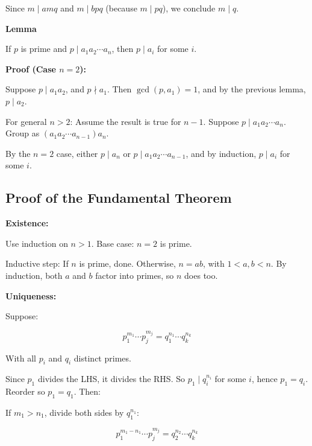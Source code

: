 Since \(m \mid amq\) and \(m \mid bpq\) (because \(m \mid pq\)), we conclude \(m \mid q\).

\QED

\textbf{Lemma} 

If \(p\) is prime and \(p \mid a_1a_2 \cdots a_n\), then \(p \mid a_i\) for some \(i\).
\vspace{\baselineskip}

\textbf{Proof (Case \(n=2\)):} 

Suppose \(p \mid a_1a_2\), and \(p \nmid a_1\).
Then \(\gcd(p, a_1) = 1\), and by the previous lemma, \(p \mid a_2\).
\vspace{\baselineskip}

For general \(n > 2\): Assume the result is true for \(n-1\). Suppose \(p \mid a_1a_2 \cdots a_n\).
Group as \((a_1a_2 \cdots a_{n-1})a_n\).
\vspace{\baselineskip}

By the \(n=2\) case, either \(p \mid a_n\) or \(p \mid a_1a_2 \cdots a_{n-1}\), and by induction, \(p \mid a_i\) for some \(i\).

\QED

\subsection{Proof of the Fundamental Theorem}

\textbf{Existence:}

Use induction on \(n > 1\). Base case: \(n = 2\) is prime.
\vspace{\baselineskip}

Inductive step: If \(n\) is prime, done. Otherwise, \(n = ab\), with \(1 < a, b < n\).
By induction, both \(a\) and \(b\) factor into primes, so \(n\) does too.
\vspace{\baselineskip}

\textbf{Uniqueness:}

Suppose:

\[
	p_1^{m_1} \cdots p_j^{m_j} = q_1^{n_1} \cdots q_k^{n_k}
\]

With all \(p_i\) and \(q_i\) distinct primes.
\vspace{\baselineskip}

Since \(p_1\) divides the LHS, it divides the RHS. So \(p_1 \mid q_i^{n_i}\) for some \(i\), hence \(p_1 = q_i\).
Reorder so \(p_1 = q_1\). Then:

If \(m_1 > n_1\), divide both sides by \(q_1^{n_1}\):

\[
	p_1^{m_1-n_1} \cdots p_j^{m_j} = q_2^{n_2} \cdots q_k^{n_k}
\]

